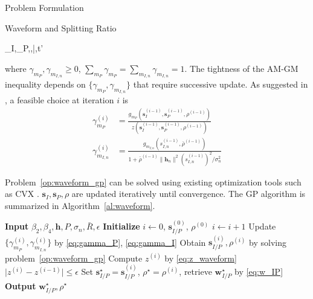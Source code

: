 \documentclass[journal]{IEEEtran}
\begin{document}
\begin{section}{Problem Formulation}
\begin{subsection}{Waveform and Splitting Ratio}
			\begin{mini!}
				{\boldsymbol{s}_I,_P,\rho,\bar{\rho},t'}{}{\label{op:waveform_gp}}{}
			\end{mini!}
			where $\gamma_{m_P},\gamma_{m_{I,n}} \ge 0$, $\sum_{m_P}\gamma_{m_P}=\sum_{m_{I,n}}\gamma_{m_{I,n}}=1$. The tightness of the AM-GM inequality depends on $\{\gamma_{m_P},\gamma_{m_{I,n}}\}$ that require successive update. As suggested in \cite{Clerckx2018b}, a feasible choice at iteration $i$ is
			\begin{align}
				\gamma_{m_P}^{(i)} & = \frac{g_{m_P}(\boldsymbol{s}_I^{(i-1)},\boldsymbol{s}_P^{(i-1)},\rho^{(i-1)})}{z(\boldsymbol{s}_I^{(i-1)},\boldsymbol{s}_P^{(i-1)},\rho^{(i-1)})}\label{eq:gamma_P}\\
				\gamma_{m_{I,n}}^{(i)} & = \frac{g_{m_{I,n}}(s_{I,n}^{(i-1)},\bar{\rho}^{(i-1)})}{1+{\bar{\rho}^{(i-1)}\lVert{\boldsymbol{h}_n}\rVert^2 (s_{I,n}^{(i-1)})^2}/{\sigma_n^2}}\label{eq:gamma_I}
			\end{align}

			Problem~\ref{op:waveform_gp} can be solved using existing optimization tools such as CVX \cite{Grant2013}. $\boldsymbol{s}_I,\boldsymbol{s}_P,\rho$ are updated iteratively until convergence. The GP algorithm is summarized in Algorithm~\ref{al:waveform}.
			\begin{algorithm}[!t]
				\caption{GP: Waveform and Splitting Ratio}
				\label{al:waveform}
				\begin{algorithmic}[1]
					\State \textbf{Input} $\beta_2,\beta_4,\boldsymbol{h},P,\sigma_n,\bar{R},\epsilon$
					\State \textbf{Initialize} $i \gets 0$, $\boldsymbol{s}_{I/P}^{(0)}$, $\rho^{(0)}$
					\Repeat
						\State $i \gets i + 1$
						\State Update $\{\gamma_{m_P}^{(i)},\gamma_{m_{I,n}}^{(i)}\}$ by \ref{eq:gamma_P}, \ref{eq:gamma_I}
						\State Obtain $\boldsymbol{s}_{I/P}^{(i)},\rho^{(i)}$ by solving problem~\ref{op:waveform_gp}
						\State Compute $z^{(i)}$ by \ref{eq:z_waveform}
					\Until $\lvert z^{(i)} - z^{(i-1)} \rvert \le \epsilon$
					\State Set $\boldsymbol{s}_{I/P}^{\star}=\boldsymbol{s}_{I/P}^{(i)}$, $\rho^{\star}=\rho^{(i)}$, retrieve $\boldsymbol{w}_{I/P}^{\star}$ by \ref{eq:w_IP}
					\State \textbf{Output} $\boldsymbol{w}_{I/P}^{\star}, \rho^{\star}$
				\end{algorithmic}
			\end{algorithm}
		\end{subsection}



\end{section}
\end{document}
